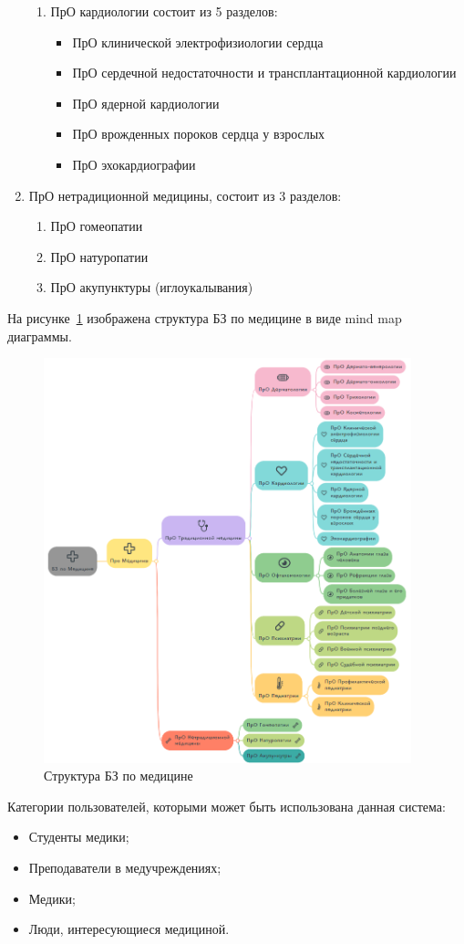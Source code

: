 \begin{enumerate}
\begin{enumerate}
		\item ПрО кардиологии состоит из 5 разделов:
		\begin{itemize}
			\item ПрО клинической электрофизиологии сердца
			\item ПрО сердечной недостаточности и трансплантационной кардиологии
			\item ПрО ядерной кардиологии
			\item ПрО врожденных пороков сердца у взрослых
			\item ПрО эхокардиографии\\
		\end{itemize}
	\end{enumerate}
	\item ПрО нетрадиционной медицины, состоит из 3 разделов:
	\begin{enumerate}
		\item ПрО гомеопатии
		\item ПрО натуропатии
		\item ПрО акупунктуры (иглоукалывания)\\
		\end{enumerate}
\end{enumerate}
На рисунке~\ref{fig:sections/map} изображена структура БЗ по медицине в виде mind map диаграммы.
\begin{figure}[H]
	\centering
	\includegraphics[width=0.95\textwidth]{sections/map.jpeg}
	\caption{Структура БЗ по медицине}
	\label{fig:sections/map}
\end{figure}
Категории пользователей, которыми может быть использована данная система:
\begin{itemize}
	\item Студенты медики;
	\item Преподаватели в медучреждениях;
	\item Медики;
	\item Люди, интересующиеся медициной.
\end{itemize}
